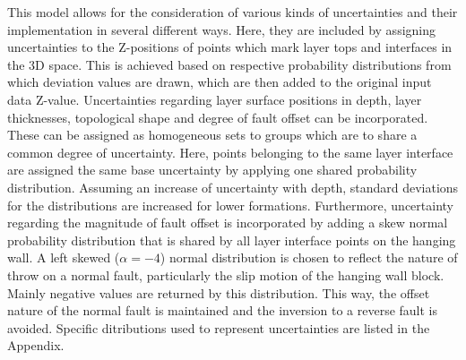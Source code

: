 		This model allows for the consideration of various kinds of uncertainties and their implementation in several different ways. Here, they are included by assigning uncertainties to the Z-positions of points which mark layer tops and interfaces in the 3D space. This is achieved based on respective probability distributions from which deviation values are drawn, which are then added to the original input data Z-value. Uncertainties regarding layer surface positions in depth, layer thicknesses, topological shape and degree of fault offset can be incorporated. These can be assigned as homogeneous sets to groups which are to share a common degree of uncertainty. Here, points belonging to the same layer interface are assigned the same base uncertainty by applying one shared probability distribution. Assuming an increase of uncertainty with depth, standard deviations for the distributions are increased for lower formations. Furthermore, uncertainty regarding the magnitude of fault offset is incorporated by adding a skew normal probability distribution that is shared by all layer interface points on the hanging wall. A left skewed ($\alpha=-4$) normal distribution is chosen to reflect the nature of throw on a normal fault, particularly the slip motion of the hanging wall block. Mainly negative values are returned by this distribution. This way, the offset nature of the normal fault is maintained and the inversion to a reverse fault is avoided. Specific ditributions used to represent uncertainties are listed in the Appendix.
